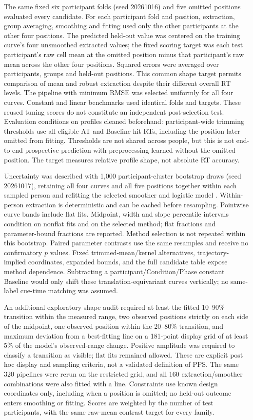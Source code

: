 The same fixed six participant folds (seed 20261016) and five omitted positions evaluated every candidate. For each participant fold and position, extraction, group averaging, smoothing and fitting used only the other participants at the other four positions. The predicted held-out value was centered on the training curve's four unsmoothed extracted values; the fixed scoring target was each test participant's raw cell mean at the omitted position minus that participant's raw mean across the other four positions. Squared errors were averaged over participants, groups and held-out positions. This common shape target permits comparison of mean and robust extraction despite their different overall RT levels. The pipeline with minimum RMSE was selected uniformly for all four curves. Constant and linear benchmarks used identical folds and targets. These reused tuning scores do not constitute an independent post-selection test. Evaluation conditions on profiles cleaned beforehand: participant-wide trimming thresholds use all eligible AT and Baseline hit RTs, including the position later omitted from fitting. Thresholds are not shared across people, but this is not end-to-end prospective prediction with preprocessing learned without the omitted position. The target measures relative profile shape, not absolute RT accuracy.

Uncertainty was described with 1{,}000 participant-cluster bootstrap draws (seed 20261017), retaining all four curves and all five positions together within each sampled person and refitting the selected smoother and logistic model \citep{EfronTibshirani1993}. Within-person extraction is deterministic and can be cached before resampling. Pointwise curve bands include flat fits. Midpoint, width and slope percentile intervals condition on nonflat fits and on the selected method; flat fractions and parameter-bound fractions are reported. Method selection is not repeated within this bootstrap. Paired parameter contrasts use the same resamples and receive no confirmatory $p$ values. Fixed trimmed-mean/kernel alternatives, trajectory-implied coordinates, expanded bounds, and the full candidate table expose method dependence. Subtracting a participant/Condition/Phase constant Baseline would only shift these translation-equivariant curves vertically; no same-label cue-time matching was assumed.

An additional exploratory shape audit required at least the fitted 10--90\% transition within the measured range, two observed positions strictly on each side of the midpoint, one observed position within the 20--80\% transition, and maximum deviation from a best-fitting line on a 181-point display grid of at least 5\% of the model's observed-range change. Positive amplitude was required to classify a transition as visible; flat fits remained allowed. These are explicit post hoc display and sampling criteria, not a validated definition of PPS. The same 320 pipelines were rerun on the restricted grid, and all 160 extraction/smoother combinations were also fitted with a line. Constraints use known design coordinates only, including when a position is omitted; no held-out outcome enters smoothing or fitting. Scores are weighted by the number of test participants, with the same raw-mean contrast target for every family.

